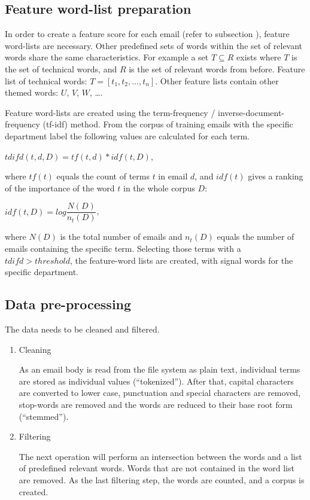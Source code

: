 \documentclass[journal]{IEEEtran}
\begin{document}
\subsection{Feature word-list preparation}

In order to create a feature score for each email (refer to subsection ), feature word-lists are necessary. Other predefined sets of words within the set of relevant words share the same characteristics. For example a set $T \subseteq R$ exists where $T$
is the set of technical words, and $R$ is the set of relevant words from before. Feature list of technical words: $T = [t_1, t_2, \dots, t_n]$.
Other feature lists contain other themed words: $U$, $V$, $W$, \dots .

Feature word-lists are created using the term-frequency / inverse-document-frequency (tf-idf) method. From the corpus of training emails with the specific department label the following values are calculated for each term. 
\begin{center}
    $tdifd(t, d, D) = tf(t, d) * idf(t, D)$,
\end{center}
where $tf(t)$ equals the count of terms $t$ in email $d$, and $idf(t)$ gives a ranking of the importance of the word $t$ in the whole corpus $D$: 
\begin{center}
    $idf(t, D) = log\dfrac{N(D)}{n_t(D)}$, 
\end{center}
where $N(D)$ is the total number of emails and $n_t(D)$ equals the number of emails containing the specific term. 
Selecting those terms with a $tdifd > threshold$, the feature-word lists are created, with signal words for the specific department.

\subsection{Data pre-processing}
The data needs to be cleaned and filtered.

\begin{enumerate}
    \item Cleaning

    As an email body is read from the file system as plain text, individual terms are stored as individual values (``tokenized''). After that, capital characters are converted to lower case, punctuation and special characters are removed, stop-words are removed and the words are reduced to their base root form (``stemmed'').

    \item Filtering

    The next operation will perform an intersection between the words and a list of predefined relevant words. Words that are not contained in the word list are removed. As the last filtering step, the words are counted, and a corpus is created.

\end{enumerate}
\end{document}
